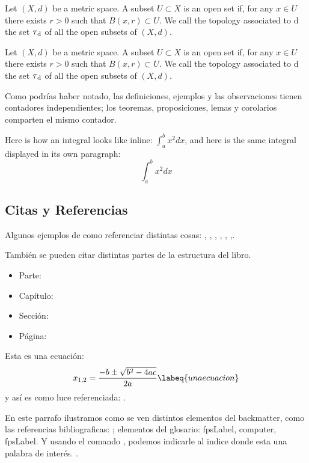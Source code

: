 \begin{example}
    Let $(X, d)$ be a metric space. A subset $U \subset X$ is an open set if, for any $x \in U$ there exists $r > 0$ such that $B(x, r) \subset U$. We call the topology associated to d the set $\tau\textsubscript{d}$ of all the open subsets of $(X, d).$
\end{example}

\begin{remark}
    Let $(X, d)$ be a metric space. A subset $U \subset X$ is an open set if, for any $x \in U$ there exists $r > 0$ such that $B(x, r) \subset U$. We call the topology associated to d the set $\tau\textsubscript{d}$ of all the open subsets of $(X, d).$
\end{remark}

Como podrías haber notado, las definiciones, ejemplos y las observaciones tienen contadores independientes; los teoremas, proposiciones, lemas y corolarios comparten el mismo contador.

\begin{remark}
    Here is how an integral looks like inline: $\int_{a}^{b} x^2 dx$, and here is the same integral displayed in its own paragraph: \[\int_{a}^{b} x^2 dx\]
\end{remark}

\subsection{Citas y Referencias}
Algunos ejemplos de como referenciar distintas cosas: , , , , , ,. 

También se pueden citar distintas partes de la estructura del libro.
\begin{itemize}
    \item Parte: 
    \item Capítulo: 
    \item Sección: 
    \item Página: 
\end{itemize}

Esta es una ecuación:
\begin{equation}
    x_{1,2}=\frac{-b\pm\sqrt{b^2-4ac}}{2a}
    \labeq{unaecuacion}
\end{equation}
y así es como luce referenciada: .

En este parrafo ilustramos como se ven distintos elementos del backmatter, como las referencias bibliograficas: ; elementos del glosario: \acrfull{fpsLabel}, \gls{computer}, \acrshort{fpsLabel}. Y usando el comando , podemos indicarle al indice donde esta una palabra de interés. .




